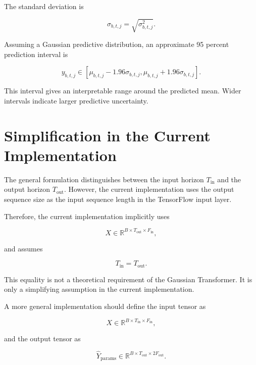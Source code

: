 \documentclass[a4paper]{article}
\begin{document}
        The standard deviation is
        
        \[
            \sigma_{b,t,j}
            =
            \sqrt{
                \sigma^2_{b,t,j}
            }.
        \]
        
        Assuming a Gaussian predictive distribution, an approximate 95 percent prediction interval is
        
        \[
            y_{b,t,j}
            \in
            \left[
                \mu_{b,t,j}
                -
                1.96\sigma_{b,t,j},
                \mu_{b,t,j}
                +
                1.96\sigma_{b,t,j}
            \right].
        \]
        
        This interval gives an interpretable range around the predicted mean. Wider intervals indicate larger predictive uncertainty.
    
    
    \section{Simplification in the Current Implementation}
        
        The general formulation distinguishes between the input horizon \(T_{\mathrm{in}}\) and the output horizon \(T_{\mathrm{out}}\). However, the current implementation uses the output sequence size as the input sequence length in the TensorFlow input layer.
        
        Therefore, the current implementation implicitly uses
        
        \[
            X
            \in
            \mathbb{R}^{B \times T_{\mathrm{out}} \times F_{\mathrm{in}}},
        \]
        
        and assumes
        
        \[
            T_{\mathrm{in}}
            =
            T_{\mathrm{out}}.
        \]
        
        This equality is not a theoretical requirement of the Gaussian Transformer. It is only a simplifying assumption in the current implementation.
        
        A more general implementation should define the input tensor as
        
        \[
            X
            \in
            \mathbb{R}^{B \times T_{\mathrm{in}} \times F_{\mathrm{in}}},
        \]
        
        and the output tensor as
        
        \[
            \hat{Y}_{\mathrm{params}}
            \in
            \mathbb{R}^{B \times T_{\mathrm{out}} \times 2F_{\mathrm{out}}}.
        \]
    
\end{document}
